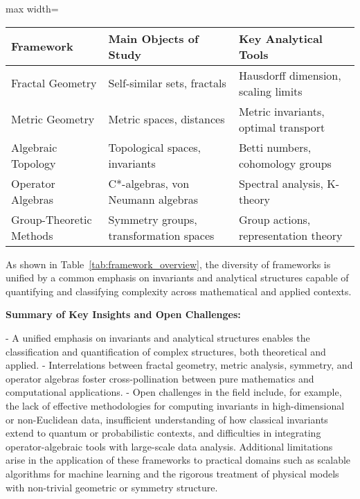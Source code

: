 \documentclass[sigconf]{acmart}
\begin{document}
\begin{table*}[htbp]
\centering
\caption{Principal Frameworks, Core Objects, and Key Analytical Tools}
\label{tab:framework_overview}
\begin{adjustbox}{max width=\textwidth}
\begin{tabular}{lll}
\toprule
\textbf{Framework}         & \textbf{Main Objects of Study}         & \textbf{Key Analytical Tools}             \\
\midrule
Fractal Geometry           & Self-similar sets, fractals            & Hausdorff dimension, scaling limits       \\
Metric Geometry            & Metric spaces, distances                & Metric invariants, optimal transport      \\
Algebraic Topology         & Topological spaces, invariants          & Betti numbers, cohomology groups          \\
Operator Algebras          & C*-algebras, von Neumann algebras       & Spectral analysis, K-theory               \\
Group-Theoretic Methods    & Symmetry groups, transformation spaces  & Group actions, representation theory      \\
\bottomrule
\end{tabular}
\end{adjustbox}
\end{table*}

As shown in Table~\ref{tab:framework_overview}, the diversity of frameworks is unified by a common emphasis on invariants and analytical structures capable of quantifying and classifying complexity across mathematical and applied contexts.

\textbf{Summary of Key Insights and Open Challenges:}

- A unified emphasis on invariants and analytical structures enables the classification and quantification of complex structures, both theoretical and applied.
- Interrelations between fractal geometry, metric analysis, symmetry, and operator algebras foster cross-pollination between pure mathematics and computational applications.
- Open challenges in the field include, for example, the lack of effective methodologies for computing invariants in high-dimensional or non-Euclidean data, insufficient understanding of how classical invariants extend to quantum or probabilistic contexts, and difficulties in integrating operator-algebraic tools with large-scale data analysis. Additional limitations arise in the application of these frameworks to practical domains such as scalable algorithms for machine learning and the rigorous treatment of physical models with non-trivial geometric or symmetry structure.
\end{document}
